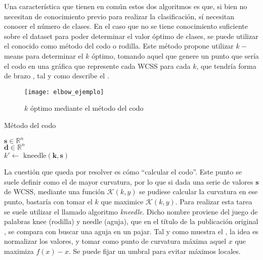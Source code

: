 				Una característica que tienen en común estos dos algoritmos es que, si bien no necesitan de conocimiento previo para realizar la clasificación, sí necesitan conocer el número de clases. En el caso que no se tiene conocimiento suficiente sobre el dataset para poder determinar el valor óptimo de clases, se puede utilizar el conocido como método del codo o rodilla. Este método propone utilizar $k-$means para determinar el $k$ óptimo, tomando aquel que genere un punto que sería el codo en una gráfica que represente cada WCSS para cada $k$, que tendría forma de brazo \cite{elbow}, tal y como describe el . \\
				
				\begin{figure}[!h]
					\centering
					\texttt{[image: elbow\_ejemplo]}
					\caption{$k$ óptimo mediante el método del codo}
					\label{fig:ejemplo_codo}
				\end{figure}
				
				\begin{algorithm}[!h]
					\DontPrintSemicolon
					
					\caption{Método del codo}
					\label{algo:codo}
					
					$\textbf{s} \in \mathbb{R}^n$\\
					$\textbf{d} \in \mathbb{R}^n$\\
					$k' \gets$ kneedle$(\textbf{k}, \textbf{s})$
				\end{algorithm}
				
				
				La cuestión que queda por resolver es cómo ``calcular el codo''. Este punto se suele definir como el de mayor curvatura, por lo que si dada una serie de valores $\textbf{s}$ de WCSS, mediante una función $\mathcal{K}(k, y)$ se pudiese calcular la curvatura en ese punto, bastaría con tomar el $k$ que maximice $\mathcal{K}(k, y)$. Para realizar esta tarea se suele utilizar el llamado algoritmo \textit{kneedle}. Dicho nombre proviene del juego de palabras knee (rodilla) y needle (aguja), que en el título de la publicación original \cite{kneedle}, se compara con buscar una aguja en un pajar. Tal y como muestra el , la idea es normalizar los valores, y tomar como punto de curvatura máxima aquel $x$ que maximiza $f(x) - x$. Se puede fijar un umbral para evitar máximos locales. 
				
